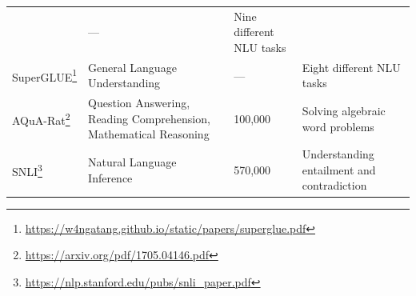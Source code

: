 \documentclass[]{krantz}
\renewcommand{\href}[2]{#2\footnote{\url{#1}}}
\begin{document}
\begin{longtable}[]{@{}llll@{}}
\begin{minipage}[t]{0.24\columnwidth}
\end{minipage} & \begin{minipage}[t]{0.10\columnwidth}\raggedright
---\strut
\end{minipage} & \begin{minipage}[t]{0.23\columnwidth}\raggedright
Nine different NLU tasks\strut
\end{minipage}\tabularnewline
\begin{minipage}[t]{0.31\columnwidth}\raggedright
\href{https://w4ngatang.github.io/static/papers/superglue.pdf}{SuperGLUE}\strut
\end{minipage} & \begin{minipage}[t]{0.24\columnwidth}\raggedright
General Language Understanding\strut
\end{minipage} & \begin{minipage}[t]{0.10\columnwidth}\raggedright
---\strut
\end{minipage} & \begin{minipage}[t]{0.23\columnwidth}\raggedright
Eight different NLU tasks\strut
\end{minipage}\tabularnewline
\begin{minipage}[t]{0.31\columnwidth}\raggedright
\href{https://arxiv.org/pdf/1705.04146.pdf}{AQuA-Rat}\strut
\end{minipage} & \begin{minipage}[t]{0.24\columnwidth}\raggedright
Question Answering, Reading Comprehension, Mathematical Reasoning\strut
\end{minipage} & \begin{minipage}[t]{0.10\columnwidth}\raggedright
100,000\strut
\end{minipage} & \begin{minipage}[t]{0.23\columnwidth}\raggedright
Solving algebraic word problems\strut
\end{minipage}\tabularnewline
\begin{minipage}[t]{0.31\columnwidth}\raggedright
\href{https://nlp.stanford.edu/pubs/snli_paper.pdf}{SNLI}\strut
\end{minipage} & \begin{minipage}[t]{0.24\columnwidth}\raggedright
Natural Language Inference\strut
\end{minipage} & \begin{minipage}[t]{0.10\columnwidth}\raggedright
570,000\strut
\end{minipage} & \begin{minipage}[t]{0.23\columnwidth}\raggedright
Understanding entailment and contradiction\strut

\end{minipage}
\end{longtable}
\end{document}
